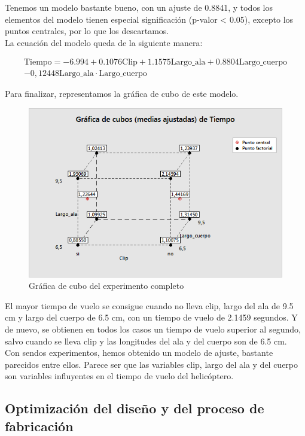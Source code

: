 \documentclass[12pt,a4paper,twoside,openright,titlepage,final]{article}
\begin{document}
Tenemos un modelo bastante bueno, con un ajuste de 0.8841, y todos los elementos del modelo tienen especial significación (p-valor < 0.05), excepto los puntos centrales, por lo que los descartamos.\\

La ecuación del modelo queda de la siguiente manera:

\begin{multline*}
\text{Tiempo} = -6.994 + 0.1076 \text{Clip} + 1.1575 \text{Largo\_ala} + 0.8804 \text{Largo\_cuerpo} \\ - 0,12448 \text{Largo\_ala}\cdot \text{Largo\_cuerpo}
\end{multline*}

Para finalizar, representamos la gráfica de cubo de este modelo.\\

\begin{figure}[htbp!]
	\centering
	\includegraphics[width=0.7\linewidth]{imagenes/Experimento_completo/Grafica_de_cubos_(medias_ajustadas)_de_Tiempo}
	\caption{Gráfica de cubo del experimento completo}
	\label{fig:cubo_completo}
\end{figure}

El mayor tiempo de vuelo se consigue cuando no lleva clip, largo del ala de 9.5 cm y largo del cuerpo de 6.5 cm, con un tiempo de vuelo de 2.1459 segundos. Y de nuevo, se obtienen en todos los casos un tiempo de vuelo superior al segundo, salvo cuando se lleva clip y las longitudes del ala y del cuerpo son de 6.5 cm.\\

Con sendos experimentos, hemos obtenido un modelo de ajuste, bastante parecidos entre ellos. Parece ser que las variables clip, largo del ala y del cuerpo son variables influyentes en el tiempo de vuelo del helicóptero.

\subsection{Optimización del diseño y del proceso de fabricación}
\end{document}
